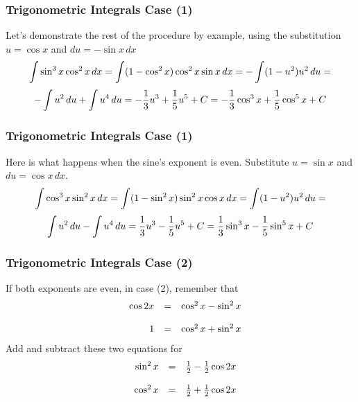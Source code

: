 \documentclass[xcolor=dvipsnames]{beamer}
\begin{document}
\begin{frame}
  \frametitle{Trigonometric Integrals Case (1)}
  Let's demonstrate the rest of the procedure by example, using the
  substitution $u=\cos{}x$ and $du=-\sin{}x\,dx$
\begin{equation}
  \label{eq:zephulai}
  \int\sin^{3}x\cos^{2}x\,dx=\int(1-\cos^{2}x)\cos^{2}x\sin{}x\,dx=-\int(1-u^{2})u^{2}\,du=\notag
\end{equation}
\begin{equation}
  \label{eq:joochupa}
  -\int{}u^{2}\,du+\int{}u^{4}\,du=-\frac{1}{3}u^{3}+\frac{1}{5}u^{5}+C=-\frac{1}{3}\cos^{3}x+\frac{1}{5}\cos^{5}x+C\notag
\end{equation}
\end{frame}

\begin{frame}
  \frametitle{Trigonometric Integrals Case (1)}
Here is what happens when the sine's exponent is even. Substitute $u=\sin{}x$ and $du=\cos{}x\,dx$.
\begin{equation}
  \label{eq:siengoel}
  \int\cos^{3}x\sin^{2}x\,dx=\int(1-\sin^{2}x)\sin^{2}x\cos{}x\,dx=\int(1-u^{2})u^{2}\,du=\notag
\end{equation}
\begin{equation}
  \label{eq:daejeile}
  \int{}u^{2}\,du-\int{}u^{4}\,du=\frac{1}{3}u^{3}-\frac{1}{5}u^{5}+C=\frac{1}{3}\sin^{3}x-\frac{1}{5}\sin^{5}x+C\notag
\end{equation}
\end{frame}

\begin{frame}
  \frametitle{Trigonometric Integrals Case (2)}
If both exponents are even, in case (2), remember that
  \begin{equation}
    \label{eq:ielahghu}
    \begin{array}{rcl}
      \cos{}2x & = & \cos^{2}x-\sin^{2}x \\
   \hspace{.5in} & & \\
      1 & = & \cos^{2}x+\sin^{2}x \\
    \end{array}
  \end{equation}
Add and subtract these two equations for
\begin{equation}
  \label{eq:einahkur}
  \begin{array}{rcl}
   \sin^{2}x & = & \frac{1}{2}-\frac{1}{2}\cos{}2x \\
   \hspace{.5in} & & \\
   \cos^{2}x & = & \frac{1}{2}+\frac{1}{2}\cos{}2x \\
  \end{array}
\end{equation}
\end{frame}
\end{document}
